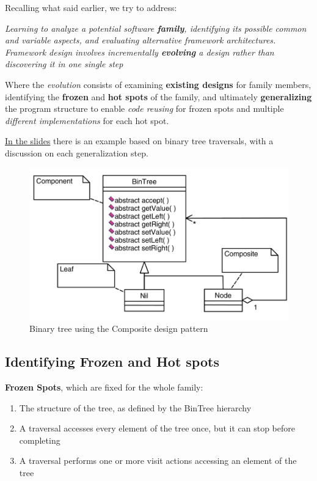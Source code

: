 Recalling what said earlier, we try to address:
\begin{center}
   \textit{Learning to analyze a potential software \textbf{family}, identifying its
   possible common and variable aspects, and evaluating
   alternative framework architectures. Framework design involves
   incrementally \textbf{evolving} a design rather than discovering it in one
   single step}
\end{center}

Where the \emph{evolution} consists of examining \textbf{existing designs} for family members, identifying the \textbf{frozen} and \textbf{hot spots} of the family, and ultimately \textbf{generalizing} the program structure to enable \textit{code reusing} for frozen spots and
multiple \textit{different implementations} for each hot spot.

\ul{In the slides} there is an example based on binary tree traversals, with a discussion on each generalization step.

\begin{figure}[htbp]
   \centering
   \includegraphics{images/bintree_composite.png}
   \caption{Binary tree using the Composite design pattern}
   \label{fig:}
\end{figure}

\subsection{Identifying Frozen and Hot spots}
\textbf{Frozen Spots}, which are fixed for the whole family:
\begin{enumerate}
   \item The structure of the tree, as defined by the
   BinTree hierarchy
   \item A traversal accesses every element of the tree
   once, but it can stop before completing
   \item A traversal performs one or more visit actions
   accessing an element of the tree
\end{enumerate}

